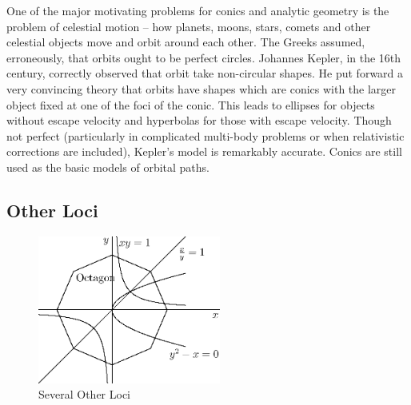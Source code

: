\documentclass[fleqn]{report}
\begin{document}
One of the major motivating problems for conics and analytic
geometry is the problem of
celestial motion -- how planets, moons, stars, comets and other
celestial objects move and orbit around each other. The Greeks
assumed, erroneously, that orbits ought to be perfect circles.
Johannes Kepler, in the 16th century, correctly observed that
orbit take non-circular shapes. He put forward a very
convincing theory that orbits have shapes which are conics with
the larger object fixed at one of the foci of the conic. This
leads to ellipses for objects without escape velocity and
hyperbolas for those with escape velocity. Though not perfect
(particularly in complicated multi-body problems or when
relativistic corrections are included), Kepler's model is
remarkably accurate. Conics are still used as the basic
models of orbital paths.

\subsection{Other Loci}
\label{other-loci}

\begin{figure}[ht]
\centering
\includegraphics[width=6cm]{figure07.eps}
\caption{Several Other Loci}
\label{figure-several-other-loci}
\end{figure}
\end{document}
